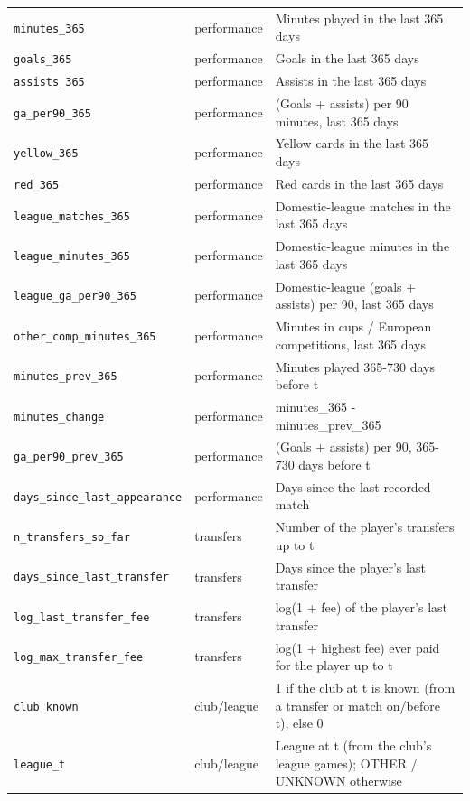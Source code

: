 \begin{table}[!h]
\begin{tabular}{llp{11.5cm}}
\texttt{minutes\_365} & performance & Minutes played in the last 365 days \\
\texttt{goals\_365} & performance & Goals in the last 365 days \\
\texttt{assists\_365} & performance & Assists in the last 365 days \\
\texttt{ga\_per90\_365} & performance & (Goals + assists) per 90 minutes, last 365 days \\
\texttt{yellow\_365} & performance & Yellow cards in the last 365 days \\
\texttt{red\_365} & performance & Red cards in the last 365 days \\
\texttt{league\_matches\_365} & performance & Domestic-league matches in the last 365 days \\
\texttt{league\_minutes\_365} & performance & Domestic-league minutes in the last 365 days \\
\texttt{league\_ga\_per90\_365} & performance & Domestic-league (goals + assists) per 90, last 365 days \\
\texttt{other\_comp\_minutes\_365} & performance & Minutes in cups / European competitions, last 365 days \\
\texttt{minutes\_prev\_365} & performance & Minutes played 365-730 days before t \\
\texttt{minutes\_change} & performance & minutes\_365 - minutes\_prev\_365 \\
\texttt{ga\_per90\_prev\_365} & performance & (Goals + assists) per 90, 365-730 days before t \\
\texttt{days\_since\_last\_appearance} & performance & Days since the last recorded match \\
\texttt{n\_transfers\_so\_far} & transfers & Number of the player's transfers up to t \\
\texttt{days\_since\_last\_transfer} & transfers & Days since the player's last transfer \\
\texttt{log\_last\_transfer\_fee} & transfers & log(1 + fee) of the player's last transfer \\
\texttt{log\_max\_transfer\_fee} & transfers & log(1 + highest fee) ever paid for the player up to t \\
\texttt{club\_known} & club/league & 1 if the club at t is known (from a transfer or match on/before t), else 0 \\
\texttt{league\_t} & club/league & League at t (from the club's league games); OTHER / UNKNOWN otherwise \\

\end{tabular}
\end{table}
